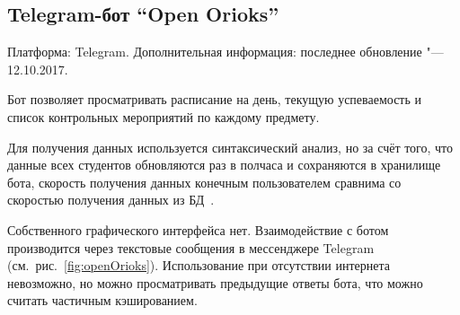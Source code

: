 \subsection{Telegram-бот ``Open Orioks''}
\label{subsec:botOpenOrioks}
Платформа: Telegram.
Дополнительная информация: последнее обновление "--- 12.10.2017.

Бот позволяет просматривать расписание на день, текущую успеваемость и список контрольных мероприятий по каждому предмету.

Для получения данных используется синтаксический анализ, но за счёт того, что данные всех студентов обновляются раз в полчаса и сохраняются в хранилище бота, скорость получения данных конечным пользователем сравнима со скоростью получения данных из БД~\cite{github:openOrioks}.

Собственного графического интерфейса нет.
Взаимодействие с ботом производится через текстовые сообщения в мессенджере Telegram (см.~рис.~\ref{fig:openOrioks}).
Использование при отсутствии интернета невозможно, но можно просматривать предыдущие ответы бота, что можно считать частичным кэшированием.

